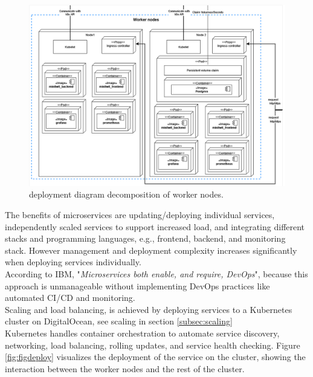 \begin{figure}[H]
    \centering
    \includegraphics[scale=0.43]{images/deployment_diagrams/devopsdiagrams-deployment worker nodes.drawio(3).png}
    \caption{\mini deployment diagram decomposition of worker nodes.}
    \label{fig:figdeployworker}
\end{figure}
The benefits of microservices are updating/deploying individual services, independently scaled services to support increased load, and integrating different stacks and programming languages, e.g., frontend, backend, and monitoring stack. However management and deployment complexity increases significantly when deploying services individually.\\
According to IBM, "\textit{Microservices both enable, and require, DevOps}", because this approach is unmanageable without implementing DevOps practices like automated CI/CD and monitoring\cite{microservices}.\\
Scaling and load balancing, is achieved by deploying services to a Kubernetes cluster on DigitalOcean, see scaling in section \ref{subsec:scaling}\\
Kubernetes handles container orchestration to automate service discovery, networking, load balancing, rolling updates, and service health checking. Figure \ref{fig:figdeploy} visualizes the deployment of the \mini service on the cluster, showing the interaction between the worker nodes and the rest of the cluster.
